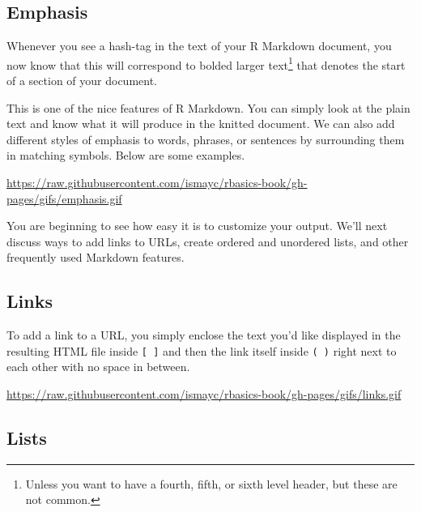 \documentclass[]{tufte-book}
\begin{document}
\subsection{Emphasis}\label{emphasis}

Whenever you see a hash-tag in the text of your R Markdown document, you
now know that this will correspond to bolded larger text\footnote{Unless
  you want to have a fourth, fifth, or sixth level header, but these are
  not common.} that denotes the start of a section of your document.

This is one of the nice features of R Markdown. You can simply look at
the plain text and know what it will produce in the knitted document. We
can also add different styles of emphasis to words, phrases, or
sentences by surrounding them in matching symbols. Below are some
examples.

\vspace{0.1in}

\begin{center}\footnotesize{\url{https://raw.githubusercontent.com/ismayc/rbasics-book/gh-pages/gifs/emphasis.gif}}\end{center}

\vspace{0.1in}

You are beginning to see how easy it is to customize your output. We'll
next discuss ways to add links to URLs, create ordered and unordered
lists, and other frequently used Markdown features.

\subsection{Links}\label{links}

To add a link to a URL, you simply enclose the text you'd like displayed
in the resulting HTML file inside \texttt{{[}\ {]}} and then the link
itself inside \texttt{(\ )} right next to each other with no space in
between.

\vspace{0.1in}

\begin{center}\footnotesize{\url{https://raw.githubusercontent.com/ismayc/rbasics-book/gh-pages/gifs/links.gif}}\end{center}

\vspace{0.1in}

\subsection{Lists}\label{lists}
\end{document}
